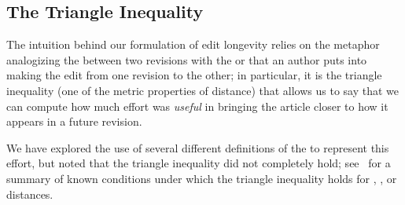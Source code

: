 \subsection{The Triangle Inequality}
\label{sec:triangle-inequality}

The intuition behind our formulation of edit longevity relies on
the metaphor analogizing the  between two revisions
with the  or  that an author puts
into making the edit from one revision to the other;
in particular, it is the triangle inequality (one of the
metric properties of distance) that allows us to say that we
can compute how much effort was \textit{useful} in bringing
the article closer to how it appears in a future revision.

We have explored the use of several different definitions of
the  to represent this effort, but
noted that the triangle inequality did not completely hold;
see~\cite{Sankoff1999} for a summary of known conditions under which
the triangle inequality holds for
, , or  distances.

